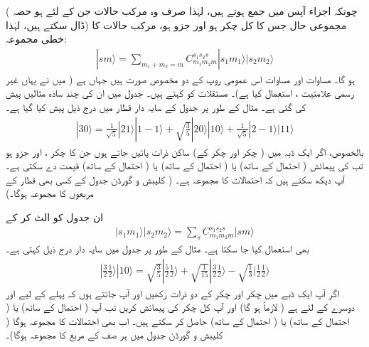 ( چونکہ  اجزاء آپس میں جمع ہوتے ہیں، لہٰذا صرف وہ مرکب حالات جن کے لئے  ہو حصہ ڈال سکتے ہیں، لہٰذا) مجموعی حال  جس کا کل چکر  ہو اور  جزو  ہو، مرکب حالات  کا خطی مجموعہ:
\begin{align}\label{مساوات_تین_ابعادی_کلیبش_گورڈن_خطی_مجموعہ}
|sm\rangle=\sum_{m_1+m_2=m}C_{m_1m_2m}^{s_1s_2s} |s_1m_1\rangle |s_2 m_2\rangle
\end{align}
ہو گا۔ مساوات  اور مساوات  اس عمومی روپ کے دو مخصوص صورت ہیں جہاں  ہے ( میں نے یہاں غیر رسمی علامتیت ،
  استعمال کیا ہے)۔ مستقلات  کو
  کہتے ہیں۔ جدول  میں ان کی چند سادہ مثالیں پیش کی گئی ہے۔ مثال کے طور پر  جدول کے سایہ دار قطار میں درج ذیل پیش کیا گیا ہے۔
\begin{align*}
| 3 0 \rangle = \tfrac{1}{\sqrt{5}} | 2 1 \rangle | 1 - 1 \rangle + \sqrt{\tfrac{3}{5}} | 2 0 \rangle | 1 0 \rangle + \tfrac{1}{\sqrt{5}} | 2 - 1 \rangle | 1 1 \rangle
\end{align*}
بالخصوص، اگر ایک ڈبہ میں ( چکر اور  چکر کے) ساکن ذرات پائیں جاتے ہوں جن کا  چکر ، اور  جزو  ہو تب  کی پیمائش ( احتمال کے ساتھ)  یا ( احتمال کے ساتھ)  یا (  احتمال کے ساتھ)  قیمت دے سکتی ہے۔ آپ دیکھ سکتے ہیں کہ احتمالات کا مجموعہ  ہے۔ ( کلیبش و گورڈن جدول کے کسی بھی قطار کے مربعوں کا مجموعہ  ہوگا۔)

 ان جدول کو الٹ کر کے
\begin{align} 
| s_1 m_1 \rangle | s_2 m_2 \rangle = \sum_s C_{m_1 m_2 m}^{s_1 s_2 s} | s m \rangle
\end{align}
 بھی استعمال کیا جا سکتا ہے۔ مثال کے طور پر  جدول میں سایہ دار  درج ذیل کہتی ہے۔
\begin{align*}
| \tfrac{3}{2} \tfrac{1}{2} \rangle | 1 0 \rangle = \sqrt{\tfrac{3}{5}} | \tfrac{5}{2} \tfrac{1}{2} \rangle + \sqrt{\tfrac{1}{15}} | \tfrac{3}{2} \tfrac{1}{2} \rangle - \sqrt{\tfrac{1}{3}} | \tfrac{1}{2} \tfrac{1}{2} \rangle
\end{align*}
اگر آپ ایک ڈبے میں  چکر اور  چکر کے دو ذرات رکھیں اور آپ جانتے ہوں کہ پہلے کے لیے  اور دوسرے کے لئے  ہے (  لازماً  ہو گا) اور آپ کل چکر  کی پیمائش کریں تب آپ ( احتمال کے ساتھ)  یا (  احتمال کے ساتھ)  یا (  احتمال کے ساتھ)  حاصل کر سکتے ہیں۔ اب بھی احتمالات کا مجموعہ  ہوگا ( کلیبش و گورڈن جدول میں ہر صف کے مربع کا مجموعہ  ہوگا)۔

